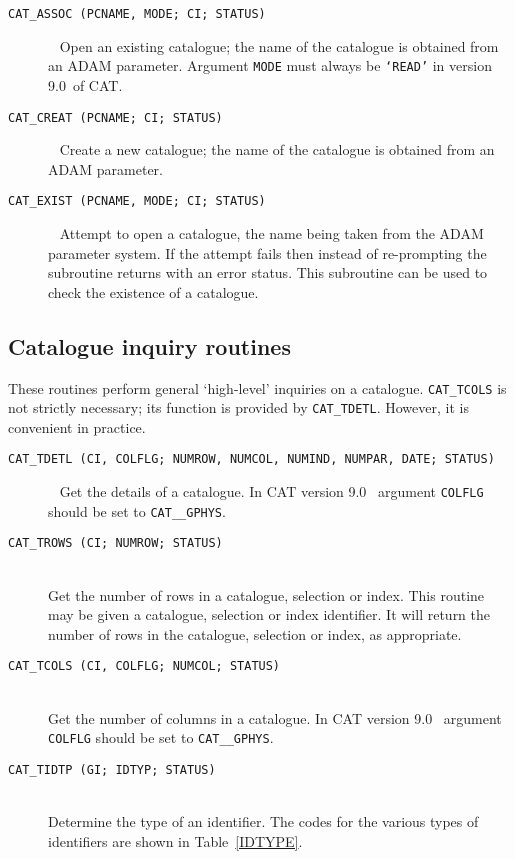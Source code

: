 \documentclass[11pt,twoside]{starlink}
\providecommand{\CATversion}{9.0~}
\begin{document}
\begin{description}

  \item[ \texttt{CAT\_ASSOC (PCNAME, MODE; CI; STATUS) } ] ~
  \newline Open an existing catalogue; the name of the catalogue is
   obtained from an ADAM parameter. Argument \texttt{MODE} must always
   be \texttt{`READ'} in version \CATversion of CAT.

  \item[ \texttt{CAT\_CREAT (PCNAME; CI; STATUS) } ] ~
  \newline Create a new catalogue; the name of the catalogue is obtained
   from an ADAM parameter.

  \item[ \texttt{CAT\_EXIST (PCNAME, MODE; CI; STATUS) } ] ~
  \newline Attempt to open a catalogue, the name being taken from the
   ADAM parameter system. If the attempt fails then instead of
   re-prompting the subroutine returns with an error status. This
   subroutine can be used to check the existence of a catalogue.

\end{description}


\subsection{Catalogue inquiry routines}

These routines perform general `high-level' inquiries on a catalogue.
\texttt{CAT\_TCOLS} is not strictly necessary; its function is
provided by \texttt{CAT\_TDETL}. However, it is convenient in practice.

\begin{description}

  \item[ \texttt{CAT\_TDETL (CI, COLFLG; NUMROW, NUMCOL, NUMIND, NUMPAR,
   DATE; STATUS) } ] ~
  \newline Get the details of a catalogue. In CAT version \CATversion
   argument \texttt{COLFLG} should be set to \texttt{CAT\_\_GPHYS}.

  \item[ \texttt{CAT\_TROWS (CI; NUMROW; STATUS) } ] ~ \\
   Get the number of rows in a catalogue, selection or index. This
   routine may be given a catalogue, selection or index identifier.  It
   will return the number of rows in the catalogue, selection or index,
   as appropriate.

  \item[ \texttt{CAT\_TCOLS (CI, COLFLG; NUMCOL; STATUS) } ] ~ \\
   Get the number of columns in a catalogue. In CAT version \CATversion
   argument \texttt{COLFLG} should be set to \texttt{CAT\_\_GPHYS}.

  \item[ \texttt{CAT\_TIDTP (GI; IDTYP; STATUS) } ] ~ \\
   Determine the type of an identifier. The codes for the various types
   of identifiers are shown in Table~\ref{IDTYPE}.

\end{description}
\end{document}
